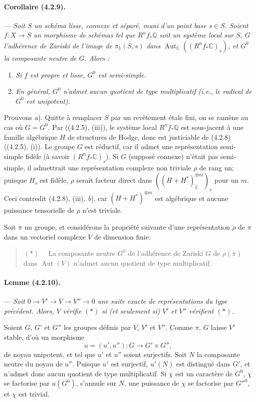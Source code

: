 \documentclass[10pt]{article}
\newcommand{\C}{\mathbb C}
\newcommand{\Q}{\mathbb Q}
\providecommand{\Aut}{\operatorname{Aut}}
\begin{document}
\paragraph{Corollaire (4.2.9).} --- {\itshape Soit $S$ un schéma lisse, connexe et séparé, muni d'un point base $s\in S$. Soient $f:X\to S$ un morphisme de schémas tel que $R^nf_*\Q$ soit un système local sur $S$, $G$ l'adhérence de Zariski de l'image de $\pi_1(S,s)$ dans $\Aut_\C((R^nf_*\C)_s)$, et $G^0$ la composante neutre de $G$. Alors :}
\begin{enumerate}[label=\alph*)]
\item {\itshape Si $f$ est propre et lisse, $G^0$ est semi-simple.}
\item {\itshape En général, $G^0$ n'admet aucun quotient de type multiplicatif (i.e., le radical de $G^0$ est unipotent).}
\end{enumerate}

Prouvons \textit{a}). Quitte à remplacer $S$ par un revêtement étale fini, on se ramène au cas où $G=G^0$. Par ((4.2.5), (iii)), le système local $R^nf_*\Q$ est sous-jacent à une famille algébrique $H$ de structures de Hodge, donc est justiciable de (4.2.8) ((4.2.5), (i)). Le groupe $G$ est réductif, car il admet une représentation semi-simple fidèle (à savoir $(R^nf_*\C)_s$). Si $G$ (supposé connexe) n'était pas semi-simple, il admettrait une représentation complexe non triviale $\rho$ de rang un; puisque $H_s$ est fidèle, $\rho$ serait facteur direct dans $((H+H^*)_\C^{\otimes m})_s$ pour un $m$. Ceci contredit (4.2.8), (iii), \textit{b}), car $(H+H^*)^{\otimes m}$ est algébrique et aucune puissance tensorielle de $\rho$ n'est triviale.

Soit $\pi$ un groupe, et considérons la propriété suivante d'une représentation $\rho$ de $\pi$ dans un vectoriel complexe $V$ de dimension finie:
\begin{quote}
\noindent $(*)\quad$ La composante neutre $G^0$ de l'adhérence de Zariski $G$ de $\rho(\pi)$ dans $\Aut(V)$ n'admet aucun quotient de type multiplicatif.
\end{quote}

\paragraph{Lemme (4.2.10).} --- {\itshape Soit $0\to V'\to V\to V''\to0$ une suite exacte de représentations du type précédent. Alors, $V$ vérifie $(*)$ si (et seulement si) $V'$ et $V''$ vérifient $(*)$.}

Soient $G$, $G'$ et $G''$ les groupes définis par $V$, $V'$ et $V''$. Comme $\pi$, $G$ laisse $V'$ stable, d'où un morphisme
\[
u=(u',u''):G\longrightarrow G'\times G'',
\]
de noyau unipotent, et tel que $u'$ et $u''$ soient surjectifs. Soit $N$ la composante neutre du noyau de $u''$. Puisque $u'$ est surjectif, $u'(N)$ est distingué dans $G'$, et n'admet donc aucun
quotient de type multiplicatif. Si $\chi$ est un caractère de $G^0$, $\chi$ se factorise par $u(G^0)$, s'annule sur $N$, une puissance de $\chi$ se factorise par $G''^0$, et $\chi$ est trivial.
\end{document}

